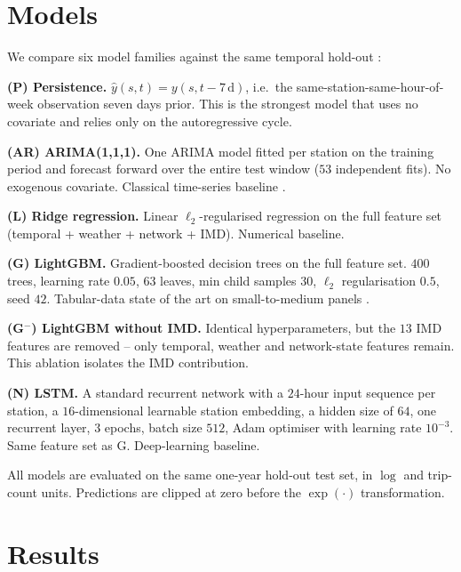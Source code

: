 \documentclass[11pt,a4paper]{article}
\begin{document}
\section{Models}
\label{sec:models}

We compare six model families against the same temporal
hold-out :

\textbf{(P) Persistence.}  $\hat{y}(s, t) = y(s, t - 7\,\text{d})$,
i.e.\ the same-station-same-hour-of-week observation seven days
prior.  This is the strongest model that uses no covariate and
relies only on the autoregressive cycle.

\textbf{(AR) ARIMA(1,1,1).}  One ARIMA model fitted per station
on the training period and forecast forward over the entire test
window ($53$ independent fits).  No exogenous covariate.  Classical
time-series baseline \citep{Box1976,Hyndman2008}.

\textbf{(L) Ridge regression.}  Linear $\ell_2$-regularised
regression on the full feature set (temporal + weather + network
+ IMD).  Numerical baseline.

\textbf{(G) LightGBM.}  Gradient-boosted decision trees
\citep{Ke2017} on the full feature set.  $400$ trees, learning
rate $0.05$, $63$ leaves, min child samples $30$, $\ell_2$
regularisation $0.5$, seed $42$.  Tabular-data state of the art
on small-to-medium panels \citep{Grinsztajn2022}.

\textbf{(G$^-$) LightGBM without IMD.}  Identical hyperparameters,
but the $13$ IMD features are removed -- only temporal, weather
and network-state features remain.  This ablation isolates the
IMD contribution.

\textbf{(N) LSTM.}  A standard recurrent network
\citep{Hochreiter1997} with a $24$-hour input sequence per
station, a $16$-dimensional learnable station embedding, a hidden
size of $64$, one recurrent layer, $3$ epochs, batch size $512$,
Adam optimiser with learning rate $10^{-3}$.  Same feature set as
G.  Deep-learning baseline.

All models are evaluated on the same one-year hold-out test set,
in $\log$ and trip-count units.  Predictions are clipped at zero
before the $\exp(\cdot)$ transformation.

\section{Results}
\label{sec:results}
\end{document}

